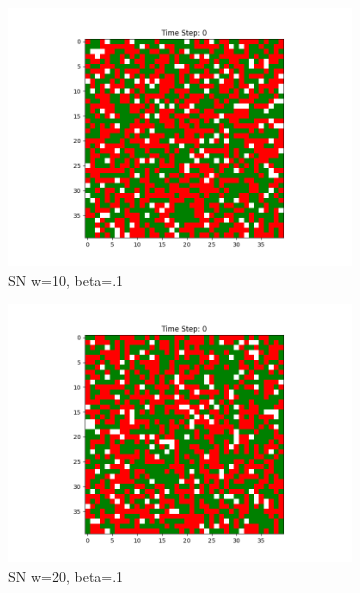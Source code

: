 \documentclass[11pt]{article}
\begin{document}
\begin{figure}[h]
		\begin{subfigure}{0.14\textwidth}
			\includegraphics[width=\linewidth]{initial_cluster_w10b10.png}
			\caption{\centering SN w=10, beta=.1}
		\end{subfigure}\hfill
		\begin{subfigure}{0.14\textwidth}
			\includegraphics[width=\linewidth]{initial_cluster_w20b10.png}
			\caption{\centering SN w=20, beta=.1}
		\end{subfigure}\hfill
		\begin{subfigure}{0.14\textwidth}

\end{subfigure}
\end{figure}
\end{document}
